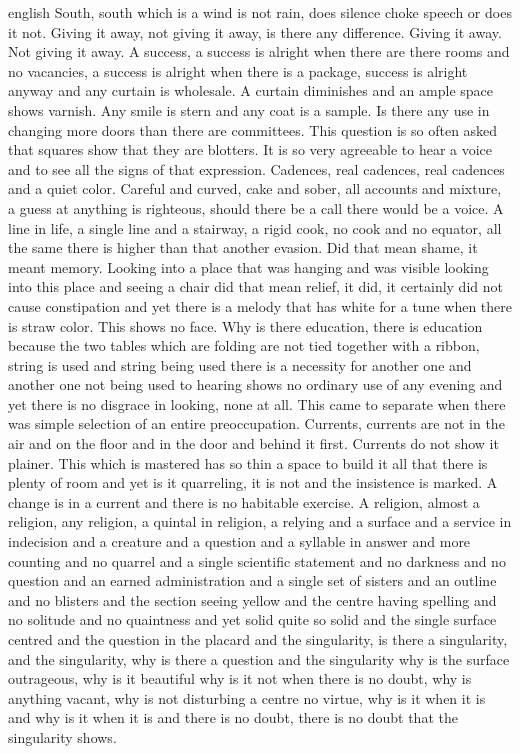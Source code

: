 \begin{otherlanguage*}{english}
South, south which is a wind is not rain, does silence choke speech or does it not.
Giving it away, not giving it away, is there any difference. Giving it away. Not giving it away.
A success, a success is alright when there are there rooms and no vacancies, a success is alright when there is a package, success is alright anyway and any curtain is wholesale. A curtain diminishes and an ample space shows varnish.
Any smile is stern and any coat is a sample. Is there any use in changing more doors than there are committees. This question is so often asked that squares show that they are blotters. It is so very agreeable to hear a voice and to see all the signs of that expression.
Cadences, real cadences, real cadences and a quiet color. Careful and curved, cake and sober, all accounts and mixture, a guess at anything is righteous, should there be a call there would be a voice.
A line in life, a single line and a stairway, a rigid cook, no cook and no equator, all the same there is higher than that another evasion. Did that mean shame, it meant memory. Looking into a place that was hanging and was visible looking into this place and seeing a chair did that mean relief, it did, it certainly did not cause constipation and yet there is a melody that has white for a tune when there is straw color. This shows no face.
Why is there education, there is education because the two tables which are folding are not tied together with a ribbon, string is used and string being used there is a necessity for another one and another one not being used to hearing shows no ordinary use of any evening and yet there is no disgrace in looking, none at all. This came to separate when there was simple selection of an entire preoccupation.
Currents, currents are not in the air and on the floor and in the door and behind it first. Currents do not show it plainer. This which is mastered has so thin a space to build it all that there is plenty of room and yet is it quarreling, it is not and the insistence is marked. A change is in a current and there is no habitable exercise.
A religion, almost a religion, any religion, a quintal in religion, a relying and a surface and a service in indecision and a creature and a question and a syllable in answer and more counting and no quarrel and a single scientific statement and no darkness and no question and an earned administration and a single set of sisters and an outline and no blisters and the section seeing yellow and the centre having spelling and no solitude and no quaintness and yet solid quite so solid and the single surface centred and the question in the placard and the singularity, is there a singularity, and the singularity, why is there a question and the singularity why is the surface outrageous, why is it beautiful why is it not when there is no doubt, why is anything vacant, why is not disturbing a centre no virtue, why is it when it is and why is it when it is and there is no doubt, there is no doubt that the singularity shows.

\end{otherlanguage*}
